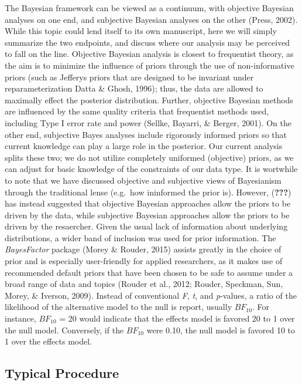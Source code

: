 \documentclass[,man, mask]{apa6}
\theoremstyle{definition}
\theoremstyle{definition}
\theoremstyle{definition}
\theoremstyle{remark}
\begin{document}
The Bayesian framework can be viewed as a continuum, with objective
Bayesian analyses on one end, and subjective Bayesian analyses on the
other (Press, 2002). While this topic could lend itself to its own
manuscript, here we will simply summarize the two endpoints, and discuss
where our analysis may be perceived to fall on the line. Objective
Bayesian analysis is closest to frequentist theory, as the aim is to
minimize the influence of priors through the use of non-informative
priors (such as Jefferys priors that are designed to be invariant under
reparameterization Datta \& Ghosh, 1996); thus, the data are allowed to
maximally effect the posterior distribution. Further, objective Bayesian
methods are influenced by the same quality criteria that frequentist
methods used, including Type I error rate and power (Sellke, Bayarri, \&
Berger, 2001). On the other end, subjective Bayes analyses include
rigorously informed priors so that current knowledge can play a large
role in the posterior. Our current analysis splits these two; we do not
utilize completely uniformed (objective) priors, as we can adjust for
basic knowledge of the constraints of our data type. It is wortwhile to
note that we have discussed objective and subjective views of
Bayesianism through the traditional lense (e.g.~how ininformed the prior
is). However, ({\textbf{???}}) has instead suggested that objective
Bayesian approaches allow the priors to be driven by the data, while
subjective Bayesian approaches allow the priors to be driven by the
resaercher. Given the usual lack of information about underlying
distributions, a wider band of inclusion was used for prior information.
The \emph{BayesFactor} package (Morey \& Rouder, 2015) assists greatly
in the choice of prior and is especially user-friendly for applied
researchers, as it makes use of recommended default priors that have
been chosen to be safe to assume under a broad range of data and topics
(Rouder et al., 2012; Rouder, Speckman, Sun, Morey, \& Iverson, 2009).
Instead of conventional \emph{F}, \emph{t}, and \emph{p}-values, a ratio
of the likelihood of the alternative model to the null is report,
usually \(BF_{10}\). For instance, \(BF_{10}\) = 20 would indicate that
the effects model is favored 20 to 1 over the null model. Conversely, if
the \(BF_{10}\) were 0.10, the null model is favored 10 to 1 over the
effects model.

\subsection{Typical Procedure}\label{typical-procedure}
\end{document}
